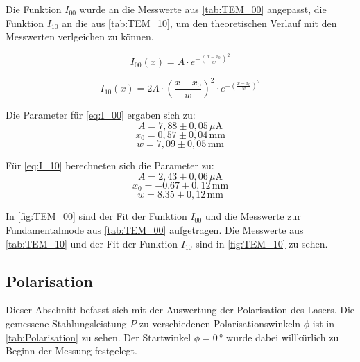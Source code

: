Die Funktion $I_{00}$ wurde an die Messwerte aus \autoref{tab:TEM_00} angepasst, die Funktion $I_{10}$ an die aus \autoref{tab:TEM_10}, um den theoretischen Verlauf mit den Messwerten verlgeichen zu können.

\begin{equation}
I_{00}(x) = A \cdot e^{-(\frac{x-x_0}{w})^{2}}
\label{eq:I_00}
\end{equation}

\begin{equation}
I_{10}(x) = 2A \cdot (\frac{x-x_0}{w})^{2} \cdot e^{-(\frac{x-x_0}{w})^{2}}
\label{eq:I_10}
\end{equation}

Die Parameter für \autoref{eq:I_00} ergaben sich zu:
\begin{equation}
A = 7,88 \pm 0,05 \,\mu \text{A}
\end{equation}
\begin{equation}
x_0 =  0,57 \pm 0,04\, \text{mm}
\end{equation}
\begin{equation}
w = 7,09 \pm 0,05\, \text{mm}
\end{equation}



Für \autoref{eq:I_10} berechneten sich die Parameter zu:
\begin{equation}
A = 2,43 \pm 0,06 \,\mu \text{A}
\end{equation}
\begin{equation}
x_0 =  -0.67 \pm 0,12\, \text{mm}
\end{equation}
\begin{equation}
w = 8.35 \pm 0,12\, \text{mm}
\end{equation}




In \autoref{fig:TEM_00} sind der Fit der Funktion $I_{00}$ und die Messwerte zur Fundamentalmode aus \autoref{tab:TEM_00} aufgetragen. Die Messwerte aus \autoref{tab:TEM_10} und der Fit der Funktion $I_{10}$ sind in \autoref{fig:TEM_10} zu sehen.






 
\subsection{Polarisation}
\label{sec:Polarisation}

Dieser Abschnitt befasst sich mit der Auswertung der Polarisation des Lasers. Die gemessene Stahlungsleistung $P$ zu verschiedenen Polarisationswinkeln $\phi$ ist in \autoref{tab:Polarisation} zu sehen. Der Startwinkel $\phi = 0$\,° wurde dabei willkürlich zu Beginn der Messung festgelegt.



